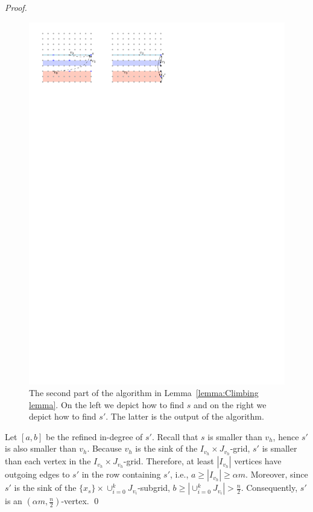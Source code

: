 \documentclass[runningheads,a4paper]{llncs}
\newcommand{\indegree}{refined in-degree\xspace}
\begin{document}
\begin{proof}
\begin{figure}[t]
\centering
\includegraphics{ClimbingLemma-2.pdf}
\caption{\small The second part of the algorithm in Lemma~\ref{lemma:Climbing lemma}. On the left we depict how to find $s$ and on the right we depict how to find $s'$. The latter is the output of the algorithm.}
\label{fig:Climbing Lemma-2}
\end{figure}

Let $[a,b]$ be the \indegree of $s'$.
Recall that $s$ is smaller than $v_h$, hence $s'$ is also smaller than $v_h$.
Because $v_h$ is the sink of the $I_{v_h}\times J_{v_h}$-grid, $s'$ is smaller than each vertex in the $I_{v_h}\times J_{v_h}$-grid.
Therefore, at least $|I_{v_h}|$ vertices have outgoing edges to $s'$ in the row containing $s'$, i.e., $a\geq |I_{v_h}| \geq \alpha m$.
Moreover, since $s'$ is the sink of the $\{x_s\}\times \cup_{i=0}^k J_{v_i}$-subgrid, $b \geq |\cup_{i=0}^k J_{v_i}|  >  \frac{n}{2}$.
Consequently, $s'$ is an $(\alpha m,  \frac{n}{2})$-vertex. \qed
\end{proof}
\end{document}
